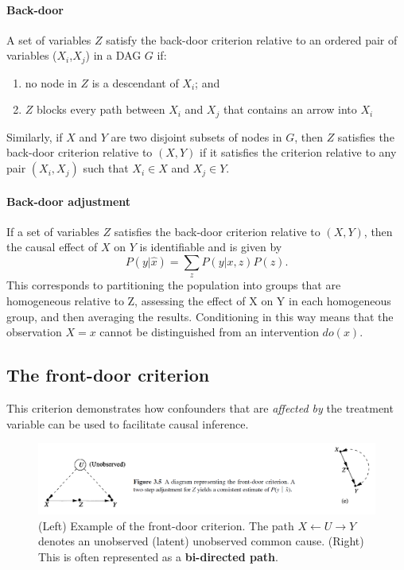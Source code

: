 \documentclass[11pt]{article}
\numberwithin{equation}{section}
\begin{document}
\paragraph{Back-door} 
A set of variables $Z$ satisfy the back-door criterion relative to an ordered pair of variables ($X_i$,$X_j$) in a DAG $G$ if:
\begin{enumerate}[noitemsep]
\item no node in $Z$ is a descendant of $X_i$; and
\item $Z$ blocks every path between $X_i$ and $X_j$ that contains an arrow into $X_i$
\end{enumerate}
Similarly, if $X$ and $Y$ are two disjoint subsets of nodes in $G$, then $Z$ satisfies the back-door criterion relative to $(X,Y)$ if it satisfies the criterion relative to any pair $(X_i, X_j)$ such that $X_i \in X$ and $X_j \in Y$.

\paragraph{Back-door adjustment}
If a set of variables $Z$ satisfies the back-door criterion relative to $(X,Y)$, then the causal effect of $X$ on $Y$ is identifiable and is given by
\begin{equation}
P(y|\hat{x}) = \sum_z P(y|x,z)P(z).
\end{equation}
This corresponds to partitioning the population into groups that are homogeneous relative to Z, assessing the effect of X on Y in each homogeneous group, and then averaging the results. Conditioning in this way means that the observation $X=x$ cannot be distinguished from an intervention $do(x)$.

\subsection{The front-door criterion}
This criterion demonstrates how confounders that are \textit{affected by} the treatment variable can be used to facilitate causal inference.

\begin{figure}
\begin{center}
\includegraphics[width=0.8\columnwidth]{figures/front-door.png}  
\end{center}
\caption{(Left) Example of the front-door criterion. The path $X \leftarrow U \rightarrow Y$ denotes an unobserved (latent) unobserved common cause. (Right) This is often represented as a \textbf{bi-directed path}. 
}
\label{Fig:front_door}
\end{figure}
\end{document}
